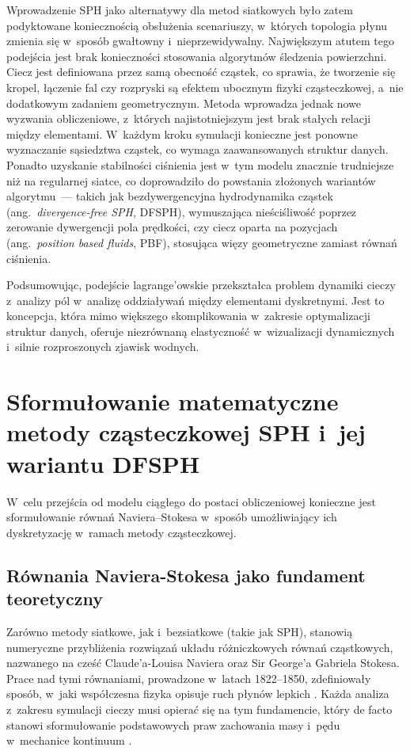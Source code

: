 Wprowadzenie SPH jako alternatywy dla metod siatkowych było zatem podyktowane koniecznością obsłużenia scenariuszy, 
w~których topologia płynu zmienia się w~sposób gwałtowny i~nieprzewidywalny. Największym atutem tego podejścia jest 
brak konieczności stosowania algorytmów śledzenia powierzchni. Ciecz jest definiowana przez samą obecność cząstek, 
co sprawia, że tworzenie się kropel, łączenie fal czy rozpryski są efektem ubocznym fizyki cząsteczkowej, a~nie 
dodatkowym zadaniem geometrycznym. Metoda wprowadza jednak nowe wyzwania obliczeniowe, z~których najistotniejszym 
jest brak stałych relacji między elementami. W~każdym kroku symulacji konieczne jest ponowne wyznaczanie sąsiedztwa 
cząstek, co wymaga zaawansowanych struktur danych. Ponadto uzyskanie stabilności ciśnienia jest w~tym modelu znacznie
trudniejsze niż na regularnej siatce, co doprowadziło do powstania złożonych wariantów algorytmu~---
takich jak bezdywergencyjna hydrodynamika cząstek (ang.~\textit{divergence-free SPH}, DFSPH)\cite{bender2015divergence},
wymuszająca nieściśliwość poprzez zerowanie dywergencji pola prędkości, czy ciecz oparta na pozycjach
(ang.~\textit{position based fluids}, PBF), stosująca więzy geometryczne zamiast równań ciśnienia.

Podsumowując, podejście lagrange'owskie przekształca problem dynamiki cieczy z~analizy pól w~analizę oddziaływań między 
elementami dyskretnymi. Jest to koncepcja, która mimo większego skomplikowania w~zakresie optymalizacji struktur danych, 
oferuje niezrównaną elastyczność w~wizualizacji dynamicznych i~silnie rozproszonych zjawisk wodnych.


\section{Sformułowanie matematyczne metody cząsteczkowej SPH i~jej wariantu DFSPH}
W~celu przejścia od modelu ciągłego do postaci obliczeniowej konieczne jest sformułowanie równań Naviera–Stokesa w~sposób umożliwiający ich dyskretyzację w~ramach metody cząsteczkowej.
\subsection{Równania Naviera-Stokesa jako fundament teoretyczny} 
Zarówno metody siatkowe, jak i~bezsiatkowe (takie jak SPH), stanowią numeryczne przybliżenia rozwiązań układu różniczkowych równań cząstkowych, nazwanego na cześć Claude'a-Louisa Naviera oraz Sir George'a Gabriela Stokesa. Prace nad tymi równaniami, prowadzone w~latach 1822--1850, zdefiniowały sposób, w~jaki współczesna fizyka opisuje ruch płynów lepkich \cite{batchelor1967introduction}. Każda analiza z~zakresu symulacji cieczy musi opierać się na tym fundamencie, który de facto stanowi sformułowanie podstawowych praw zachowania masy i~pędu w~mechanice kontinuum \cite{mclean2012continuum}.

